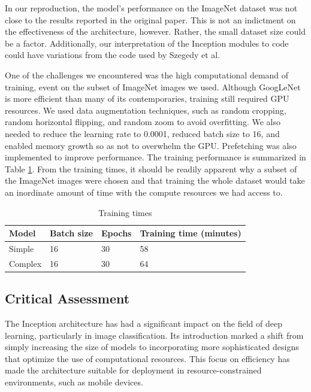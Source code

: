 \documentclass{article}
\begin{document}
In our reproduction, the model's performance on the ImageNet dataset was not  close to the results reported in the original paper. This is not an indictment on the effectiveness of the architecture, however. Rather, the small dataset size could be a factor. Additionally, our interpretation of the Inception modules to code could have variations from the code used by Szegedy et al.

One of the challenges we encountered was the high computational demand of training, event on the subset of ImageNet images we used. Although GoogLeNet is more efficient than many of its contemporaries, training still required GPU resources. We used data augmentation techniques, such as random cropping, random horizontal flipping, and random zoom to avoid overfitting\cite{dishasai_multiclass_classification}. We also needed to reduce the learning rate to 0.0001, reduced batch size to 16, and enabled memory growth\cite{tensorflow_memory_growth} so as not to overwhelm the GPU. Prefetching was also implemented to improve performance\cite{tensorflow_data_performance}. The training performance is summarized in Table \ref{tab:training_times}. From the training times, it should be readily apparent why a subset of the ImageNet images were chosen and that training the whole dataset would take an inordinate amount of time with the compute resources we had access to.

\begin{table}[ht]
    \centering
    \begin{tabular}{llll}
    \hline
    \textbf{Model} & \textbf{Batch size} & \textbf{Epochs} & \textbf{Training time (minutes)} \\  \hline
    Simple & 16 & 30 & 58 \\ \hline
    Complex & 16 & 30 & 64 \\ \hline
    \end{tabular}
    \caption{Training times}
    \label{tab:training_times}
\end{table}

\subsection{Critical Assessment}
The Inception architecture has had a significant impact on the field of deep learning, particularly in image classification. Its introduction marked a shift from simply increasing the size of models to incorporating more sophisticated designs that optimize the use of computational resources. This focus on efficiency has made the architecture suitable for deployment in resource-constrained environments, such as mobile devices.
\end{document}
